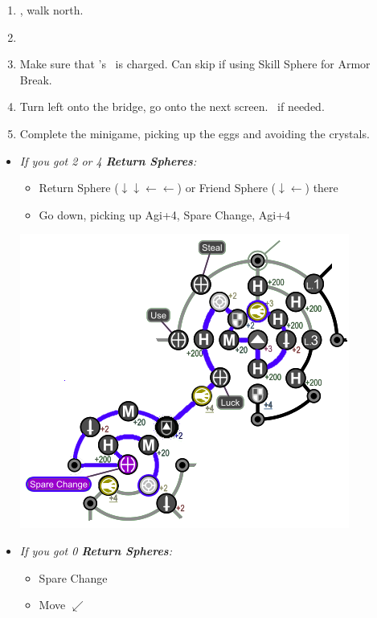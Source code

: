 \begin{enumerate}[resume]
	\item \sd, walk north.
	\item \formation{\tidus}{\kimahri}{\auron}
	\item Make sure that \rikku's \od\ is charged. Can skip if using Skill Sphere for Armor Break.
	\item Turn left onto the bridge, go onto the next screen. \save\ if needed.
	\item Complete the minigame, picking up the eggs and avoiding the crystals.
\end{enumerate}
\begin{spheregrid}
\begin{multicols}{2}
		\begin{itemize}
			\item \textit{If you got 2 or 4 \textbf{Return Spheres}:}
			      \begin{itemize}
				      \yunaf Attribute Sphere \rikku's +3 Agi (hold L)
				      \item Return Sphere ($\downarrow \downarrow \leftarrow \leftarrow$) or Friend Sphere ($\downarrow \leftarrow$) there
				      \item Go down, picking up Agi+4, Spare Change, Agi+4
			      \end{itemize}
			      \includegraphics[width=.8\columnwidth]{graphics/4_Return_final_grid}
			\item \textit{If you got 0 \textbf{Return Spheres}:}
			      \begin{itemize}
				      \item Spare Change
				      \item Move $\swarrow$

\end{itemize}
\end{itemize}
\end{multicols}
\end{spheregrid}
